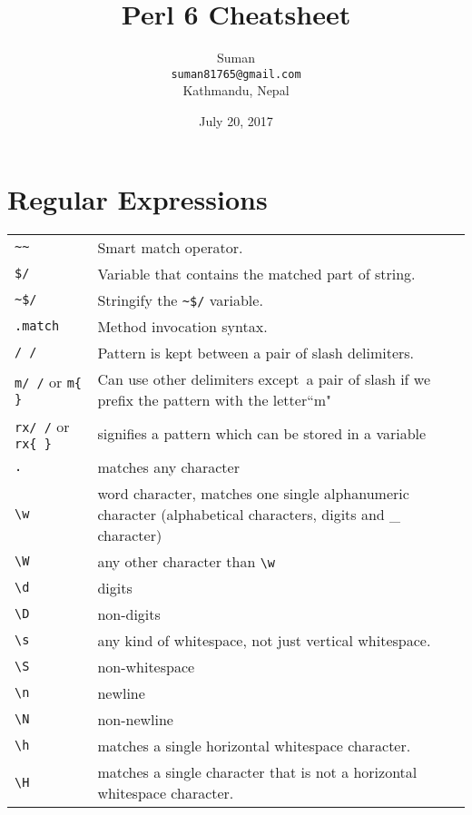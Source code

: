 \documentclass[12pt]{article}
\title{\huge\textbf{Perl 6 Cheatsheet}}
\author{Suman \\ \texttt{suman81765@gmail.com}\\ Kathmandu, Nepal}
\date{July 20, 2017}
\begin{document}
	\maketitle
	\section{Regular Expressions}
	\begin{longtable}{@{}lp{12cm}}
		\verb!~~!   & Smart match operator. \\
		\verb!$/!  & Variable that contains the matched part of string. \\
		\verb!~$/! & Stringify the \verb!~$/! variable. \\
		\verb!.match!  & Method invocation syntax. \\
		\verb!/ /!  & Pattern is kept between a pair of slash delimiters.\\
		\verb|m/ /| or \verb|m{ }|	& Can use other delimiters except\ a pair of slash if we prefix the pattern with the letter``m"\\
		\verb|rx/ /| or \verb|rx{ }| & 	signifies a pattern which can be stored in a variable\\
		\verb|.| & matches any character\\
		\verb|\w| &	word character, matches one single alphanumeric character (alphabetical characters, digits and \_ character)\\		
		\verb|\W|	& any other character than \verb|\w|\\
		\verb|\d|	& digits\\
		\verb|\D|	& non-digits\\
		\verb|\s|	& any kind of whitespace, not just vertical whitespace.\\
		\verb|\S|	& non-whitespace\\
		\verb|\n|	& newline\\
		\verb|\N|	& non-newline\\
		
		\verb|\h| & matches a single horizontal whitespace character.\\
		\verb|\H| & matches a single character that is not a horizontal whitespace character.\\
		

\end{longtable}
\end{document}
